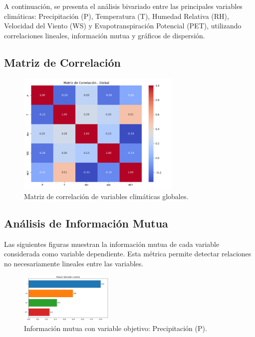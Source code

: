 A continuación, se presenta el análisis bivariado entre las principales variables climáticas: Precipitación (P), Temperatura (T), Humedad Relativa (RH), Velocidad del Viento (WS) y Evapotranspiración Potencial (PET), utilizando correlaciones lineales, información mutua y gráficos de dispersión.

\subsection{Matriz de Correlación}

\begin{figure}[H]
    \centering
    \includegraphics[width=0.7\textwidth]{resultados/global/bivariado/matriz_correlacion.png}
    \caption{Matriz de correlación de variables climáticas globales.}
    \label{fig:matriz_correlacion}
\end{figure}


\subsection{Análisis de Información Mutua}

Las siguientes figuras muestran la información mutua de cada variable considerada como variable dependiente. Esta métrica permite detectar relaciones no necesariamente lineales entre las variables.

\begin{figure}[H]
    \centering
    \includegraphics[width=0.4\textwidth]{resultados/global/bivariado/mutual_info_P.png}
    \caption{Información mutua con variable objetivo: Precipitación (P).}
    \label{fig:mutual_info_P}
\end{figure}

